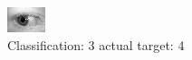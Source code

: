 \begin{figure}[h!]
\begin{center}
\includegraphics[width=0.60\columnwidth]{figures/ID729_class_3_target_4.png}
\end{center}
\caption{ Classification: 3 actual target: 4}
\label{fig:ID729_class_3_target_4}
\end{figure}
